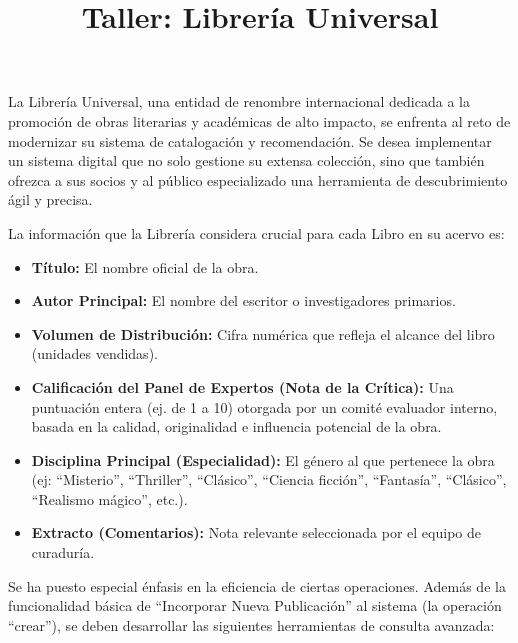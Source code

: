 \documentclass[12pt]{article}
\title{Taller: Librería Universal}
\author{}
\date{}
\begin{document}
\maketitle

La Librería Universal, una entidad de renombre internacional dedicada a la promoción de
obras literarias y académicas de alto impacto, se enfrenta al reto de modernizar su sistema
de catalogación y recomendación. Se desea implementar un sistema digital que no solo
gestione su extensa colección, sino que también ofrezca a sus socios y al público
especializado una herramienta de descubrimiento ágil y precisa.

La información que la Librería considera crucial para cada Libro en su acervo es:

\begin{itemize}
    \item \textbf{Título:} El nombre oficial de la obra.
    
    \item \textbf{Autor Principal:} El nombre del escritor o investigadores primarios.
    
    \item \textbf{Volumen de Distribución:} Cifra numérica que refleja el alcance del libro (unidades vendidas).
    
    \item \textbf{Calificación del Panel de Expertos (Nota de la Crítica):} Una puntuación entera (ej. de 1 a 10) otorgada por un comité evaluador interno, basada en la calidad, originalidad e influencia potencial de la obra.
    
    \item \textbf{Disciplina Principal (Especialidad):} El género al que pertenece la obra (ej: ``Misterio'', ``Thriller'', ``Clásico'', ``Ciencia ficción'', ``Fantasía'', ``Clásico'', ``Realismo mágico'', etc.).
    
    \item \textbf{Extracto (Comentarios):} Nota relevante seleccionada por el equipo de curaduría.
\end{itemize}

Se ha puesto especial énfasis en la eficiencia de ciertas operaciones. Además de la
funcionalidad básica de ``Incorporar Nueva Publicación'' al sistema (la operación ``crear''),
se deben desarrollar las siguientes herramientas de consulta avanzada:
\end{document}
